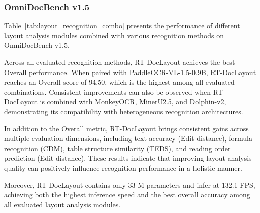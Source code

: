 \documentclass[11pt, a4paper,logo,  copyright, nonumbering]{paddleocr}
\begin{document}


\subsubsection{OmniDocBench v1.5}

Table~\ref{tab:layout_recognition_combo} presents the performance of different layout analysis modules combined with various recognition methods on OmniDocBench v1.5.

Across all evaluated recognition methods, RT-DocLayout achieves the best Overall performance. When paired with PaddleOCR-VL-1.5-0.9B, RT-DocLayout reaches an Overall score of 94.50, which is the highest among all evaluated combinations. Consistent improvements can also be observed when RT-DocLayout is combined with MonkeyOCR, MinerU2.5, and Dolphin-v2, demonstrating its compatibility with heterogeneous recognition architectures.

In addition to the Overall metric, RT-DocLayout brings consistent gains across multiple evaluation dimensions, including text accuracy (Edit distance), formula recognition (CDM), table structure similarity (TEDS), and reading order prediction (Edit distance). These results indicate that improving layout analysis quality can positively influence recognition performance in a holistic manner.

Moreover, RT-DocLayout contains only 33 M parameters and infer at 132.1 FPS, achieving both the highest inference speed and the best overall accuracy among all evaluated layout analysis modules.
\end{document}
